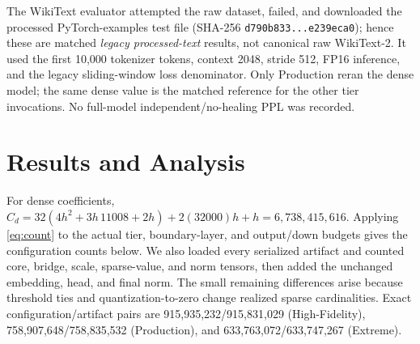 \documentclass[10pt,twocolumn]{article}
\begin{document}
The WikiText evaluator attempted the raw dataset, failed, and downloaded the processed PyTorch-examples test file (SHA-256 \texttt{d790b833...e239eca0}); hence these are matched \emph{legacy processed-text} results, not canonical raw WikiText-2.  It used the first 10,000 tokenizer tokens, context 2048, stride 512, FP16 inference, and the legacy sliding-window loss denominator.  Only Production reran the dense model; the same dense value is the matched reference for the other tier invocations.  No full-model independent/no-healing PPL was recorded.

\section{Results and Analysis}
For dense coefficients,
$C_d=32(4h^2+3h\,11008+2h)+2(32000)h+h=6{,}738{,}415{,}616$.
Applying \eqref{eq:count} to the actual tier, boundary-layer, and output/down budgets gives the configuration counts below.  We also loaded every serialized artifact and counted core, bridge, scale, sparse-value, and norm tensors, then added the unchanged embedding, head, and final norm.  The small remaining differences arise because threshold ties and quantization-to-zero change realized sparse cardinalities.
Exact configuration/artifact pairs are 915,935,232/915,831,029 (High-Fidelity), 758,907,648/758,835,532 (Production), and 633,763,072/633,747,267 (Extreme).

\begin{table}[t]
\centering
\caption{Historical full-model result. Cfg./art. separates formula-derived and artifact-audited coefficient counts (indices excluded). Reduction and ratio are structural, not byte compression. Agreement is compressed versus dense top-1 on 128 held-out tokens.}
\label{tab:results}
\scriptsize
\setlength{\tabcolsep}{2.2pt}
\end{table}
\end{document}
